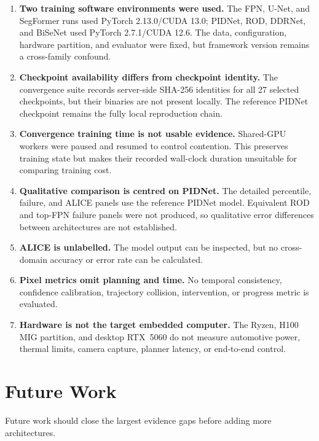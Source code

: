 \begin{enumerate}
  \item \textbf{Two training software environments were used.} The FPN,
  U-Net, and SegFormer runs used PyTorch 2.13.0/CUDA 13.0; PIDNet, ROD,
  DDRNet, and BiSeNet used PyTorch 2.7.1/CUDA 12.6. The data, configuration,
  hardware partition, and evaluator were fixed, but framework version remains
  a cross-family confound.

  \item \textbf{Checkpoint availability differs from checkpoint identity.}
  The convergence suite records server-side SHA-256 identities for all 27
  selected checkpoints, but their binaries are not present locally. The
  reference PIDNet checkpoint remains the fully local reproduction chain.

  \item \textbf{Convergence training time is not usable evidence.} Shared-GPU
  workers were paused and resumed to control contention. This preserves
  training state but makes their recorded wall-clock duration unsuitable for
  comparing training cost.

  \item \textbf{Qualitative comparison is centred on PIDNet.} The detailed
  percentile, failure, and ALICE panels use the reference PIDNet model.
  Equivalent ROD and top-FPN failure panels were not produced, so qualitative
  error differences between architectures are not established.

  \item \textbf{ALICE is unlabelled.} The model output can be inspected, but no
  cross-domain accuracy or error rate can be calculated.

  \item \textbf{Pixel metrics omit planning and time.} No temporal consistency,
  confidence calibration, trajectory collision, intervention, or progress
  metric is evaluated.

  \item \textbf{Hardware is not the target embedded computer.} The Ryzen,
  H100 MIG partition, and desktop RTX~5060 do not measure automotive power,
  thermal limits, camera capture, planner latency, or end-to-end control.
\end{enumerate}

\section{Future Work}

Future work should close the largest evidence gaps before adding more
architectures.

